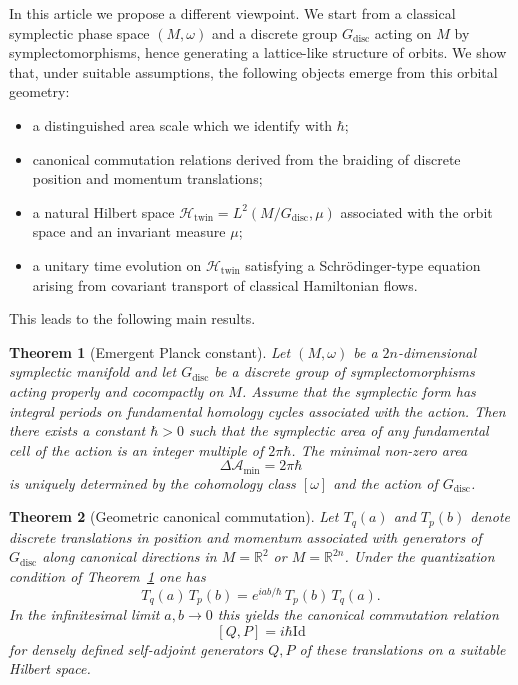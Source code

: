 \documentclass[11pt]{article}
\numberwithin{equation}{section}
\newtheorem{theorem}{Theorem}[section]
\theoremstyle{definition}
\theoremstyle{remark}
\newcommand{\R}{\mathbb{R}}
\newcommand{\Id}{\mathrm{Id}}
\newcommand{\Htw}{\mathcal{H}_{\mathrm{twin}}}
\newcommand{\Gdisc}{G_{\mathrm{disc}}}
\begin{document}
	In this article we propose a different viewpoint. We start from a
	classical symplectic phase space $(M,\omega)$ and a discrete group
	$\Gdisc$ acting on $M$ by symplectomorphisms, hence generating a
	lattice-like structure of orbits. We show that, under suitable
	assumptions, the following objects emerge from this orbital geometry:
	\begin{itemize}[leftmargin=2em]
		\item a distinguished area scale which we identify with $\hbar$;
		\item canonical commutation relations derived from the braiding of
		discrete position and momentum translations;
		\item a natural Hilbert space $\Htw=L^2(M/\Gdisc,\mu)$ associated with
		the orbit space and an invariant measure $\mu$;
		\item a unitary time evolution on $\Htw$ satisfying a Schr\"odinger-type
		equation arising from covariant transport of classical Hamiltonian
		flows.
	\end{itemize}
	
	This leads to the following main results.
	
	\begin{theorem}[Emergent Planck constant]\label{thm:intro-hbar}
		Let $(M,\omega)$ be a $2n$-dimensional symplectic manifold and let
		$\Gdisc$ be a discrete group of symplectomorphisms acting properly and
		cocompactly on $M$. Assume that the symplectic form has integral periods
		on fundamental homology cycles associated with the action. Then there
		exists a constant $\hbar>0$ such that the symplectic area of any
		fundamental cell of the action is an integer multiple of $2\pi\hbar$.
		The minimal non-zero area
		\[
		\Delta \mathcal{A}_{\min} = 2\pi \hbar
		\]
		is uniquely determined by the cohomology class $[\omega]$ and the action
		of $\Gdisc$.
	\end{theorem}
	
	\begin{theorem}[Geometric canonical commutation]\label{thm:intro-CCR}
		Let $T_q(a)$ and $T_p(b)$ denote discrete translations in position and
		momentum associated with generators of $\Gdisc$ along canonical
		directions in $M=\R^{2}$ or $M=\R^{2n}$. Under the quantization
		condition of Theorem~\ref{thm:intro-hbar} one has
		\[
		T_q(a)\, T_p(b) = e^{i ab/\hbar}\, T_p(b)\, T_q(a).
		\]
		In the infinitesimal limit $a,b\to 0$ this yields the canonical
		commutation relation
		\[
		[Q,P] = i\hbar \Id
		\]
		for densely defined self-adjoint generators $Q,P$ of these translations
		on a suitable Hilbert space.
	\end{theorem}
	
\end{document}
